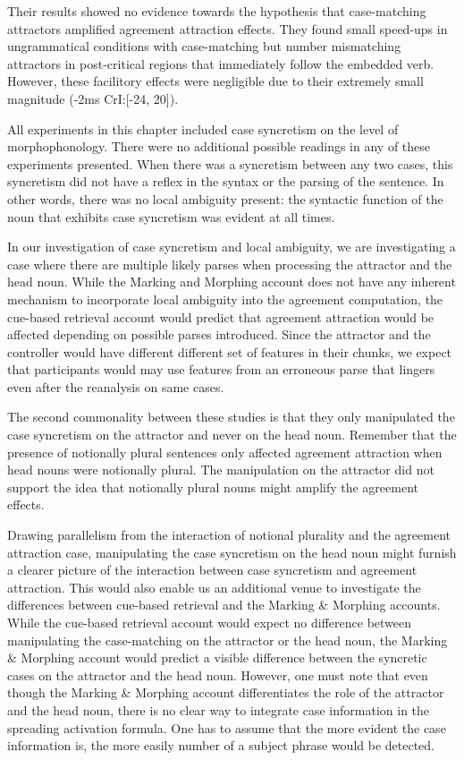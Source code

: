 Their results showed no evidence towards the hypothesis that case-matching attractors amplified agreement attraction effects. They found small speed-ups in ungrammatical conditions with case-matching but number mismatching attractors in post-critical regions that immediately follow the embedded verb. However, these facilitory effects were negligible due to their extremely small magnitude (-2ms CrI:[-24, 20]). 

All experiments in this chapter included case syncretism on the level of morphophonology. There were no additional possible readings in any of these experiments presented. When there was a syncretism between any two cases, this syncretism did not have a reflex in the syntax or the parsing of the sentence. In other words, there was no local ambiguity present: the syntactic function of the noun that exhibits case syncretism was evident at all times. 

In our investigation of case syncretism and local ambiguity, we are investigating a case where there are multiple likely parses when processing the attractor and the head noun. While the Marking and Morphing account does not have any inherent mechanism to incorporate local ambiguity into the agreement computation, the cue-based retrieval account would predict that agreement attraction would be affected depending on possible parses introduced. Since the attractor and the controller would have different different set of features in their chunks, we expect that participants would may use features from an erroneous parse that lingers even after the reanalysis on same cases.

The second commonality between these studies is that they only manipulated the case syncretism on the attractor and never on the head noun. Remember that the presence of notionally plural sentences only affected agreement attraction when head nouns were notionally plural. The manipulation on the attractor did not support the idea that notionally plural nouns might amplify the agreement effects. 

Drawing parallelism from the interaction of notional plurality and the agreement attraction case, manipulating the case syncretism on the head noun might furnish a clearer picture of the interaction between case syncretism and agreement attraction. This would also enable us an additional venue to investigate the differences between cue-based retrieval and the Marking \& Morphing accounts. While the cue-based retrieval account would expect no difference between manipulating the case-matching on the attractor or the head noun, the Marking \& Morphing account would predict a visible difference between the syncretic cases on the attractor and the head noun. However, one must note that even though the Marking \& Morphing account differentiates the role of the attractor and the head noun, there is no clear way to integrate case information in the spreading activation formula. One has to assume that the more evident the case information is, the more easily number of a subject phrase would be detected. 


